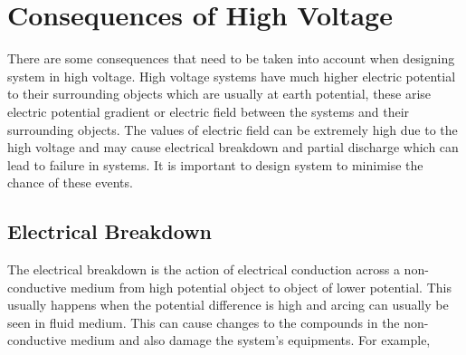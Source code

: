 \section{Consequences of High Voltage} %
There are some consequences that need to be taken into account when designing system in high voltage. High voltage systems have much higher electric potential to their surrounding objects which are usually at earth potential, these arise electric potential gradient or electric field between the systems and their surrounding objects. The values of electric field can be extremely high due to the high voltage and may cause electrical breakdown and partial discharge which can lead to failure in systems. It is important to design system to minimise the chance of these events.

\subsection{Electrical Breakdown}
The electrical breakdown is the action of electrical conduction across a non-conductive medium from high potential object to object of lower potential. This usually happens when the potential difference is high and arcing can usually be seen in fluid medium. This can cause changes to the compounds in the non-conductive medium and also damage the system's equipments. For example, 